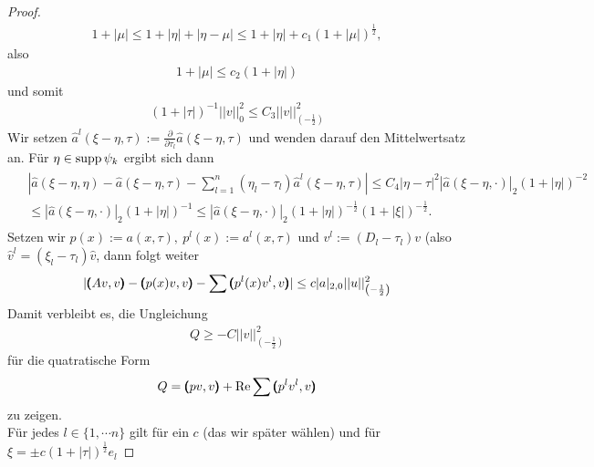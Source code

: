 \begin{proof}
\begin{align}
	1+|\mu| \le 1+| \eta|+| \eta-\mu| \le 1+|\eta|+c_1(1+|  \mu |)^{\frac{1}{2}},
\end{align}
also
\begin{align}
	1+| \mu| \le c_2\left(1+|\eta|\right)
\end{align}
und somit
\begin{align}\label{Abschaetzung 0-Norm}
	\left(1+|\tau|\right)^{-1}|| v||_0^2 \le C_3|| v||_{\left(-\frac{1}{2}\right)}^2
\end{align}
Wir setzen $\widehat{a}^l(\xi-\eta,\tau):=\frac{\partial}{\partial \tau_l}\widehat{a}(\xi-\eta,\tau)$ und wenden darauf den Mittelwertsatz an. Für $\eta\in \operatorname{supp} \psi_k$ ergibt sich dann
\begin{align}
\begin{split}	&| \widehat{a}(\xi-\eta,\eta)-\widehat{a}(\xi-\eta,\tau) -\sum\limits_{l=1}^n (\eta_l-\tau_l)\widehat{a}^l\left(\xi-\eta,\tau\right)| \le C_4| \eta-\tau|^2| \widehat{a}(\xi-\eta,\cdot)|_2\left(1+|\eta|\right)^{-2} \\&
\le | \widehat{a}(\xi-\eta,\cdot)|_2 \left(1+|\eta|\right)^{-1} \le| \widehat{a}(\xi-\eta,\cdot)|_2\left(1+|\eta|\right)^{-\frac{1}{2}}\left(1+|\xi|\right)^{-\frac{1}{2}}.
\end{split}
\end{align}
Setzen wir $p(x):=a(x,\tau),\ p^l(x):= a^l(x,\tau) $ und $v^l:=(D_l-\tau_l)v$ (also $\widehat{v}^l=\left(\xi_l-\tau_l\right)\widehat{v}$, dann folgt weiter
\begin{align}
	|\pmb(Av,v\pmb)-\pmb(p(x)v,v\pmb)-\sum\pmb(p^l(x)v^l,v\pmb)| \le c | a|_{2,0}|| u||_{\left(-\frac{1}{2}\right)}^2
\end{align}
Damit verbleibt es, die Ungleichung \begin{align}
	Q \ge -C|| v||_{\left(-\frac{1}{2}\right)}^2
\end{align}
für die quatratische Form
\begin{align}
	Q=\pmb(pv,v\pmb)+\operatorname{Re}\sum\pmb(p^lv^l,v\pmb) 
\end{align}
zu zeigen.\\
Für jedes $l\in\{1,\cdots n\}$ gilt für ein $c$ (das wir später wählen) und für $\xi = \pm c(1+| \tau|)^{\frac{1}{2}}e_l$


\end{proof}
